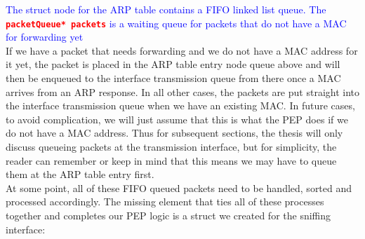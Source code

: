 \documentclass{uathesis}
\begin{document}
\noindent \textcolor{blue}{The struct node for the ARP table contains a FIFO linked list queue. The \textbf{\textcolor{red}{{\tt packetQueue* packets}}} is a waiting queue for packets that do not have a MAC for forwarding yet}\\


If we have a packet that needs forwarding and we do not have a MAC address for it yet, the packet is placed in the ARP table entry node queue above and will then be enqueued to the interface transmission queue from there once a MAC arrives from an ARP response. In all other cases, the packets are put straight into the interface transmission queue when we have an existing MAC. In future cases, to avoid complication, we will just assume that this is what the PEP does if we do not have a MAC address. Thus for subsequent sections, the thesis will only discuss queueing packets at the transmission interface, but for simplicity, the reader can remember or keep in mind that this means we may have to queue them at the ARP table entry first.\\


At some point, all of these FIFO queued packets need to be handled, sorted and processed accordingly. The missing element that ties all of these processes together and completes our PEP logic is a struct we created for the sniffing interface:\\

\\
\end{document}

